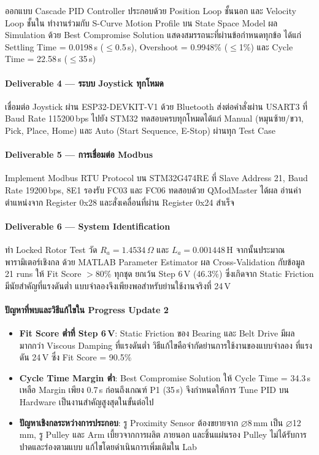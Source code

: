 ออกแบบ Cascade PID Controller
ประกอบด้วย Position Loop ชั้นนอก
และ Velocity Loop ชั้นใน
ทำงานร่วมกับ S-Curve Motion Profile
บน State Space Model
ผล Simulation ด้วย Best Compromise Solution
แสดงสมรรถนะที่ผ่านข้อกำหนดทุกข้อ
ได้แก่ Settling Time = 0.0198\,s ($\leq$0.5\,s),
Overshoot = 0.9948\% ($\leq$1\%)
และ Cycle Time = 22.58\,s ($\leq$35\,s)

\paragraph{Deliverable 4 --- ระบบ Joystick ทุกโหมด}

เชื่อมต่อ Joystick ผ่าน ESP32-DEVKIT-V1
ด้วย Bluetooth ส่งต่อคำสั่งผ่าน USART3
ที่ Baud Rate 115200\,bps ไปยัง STM32
ทดสอบครบทุกโหมดได้แก่
Manual (หมุนซ้าย/ขวา, Pick, Place, Home)
และ Auto (Start Sequence, E-Stop)
ผ่านทุก Test Case

\paragraph{Deliverable 5 --- การเชื่อมต่อ Modbus}

Implement Modbus RTU Protocol
บน STM32G474RE ที่ Slave Address 21,
Baud Rate 19200\,bps, 8E1
รองรับ FC03 และ FC06
ทดสอบด้วย QModMaster ได้ผล
อ่านค่าตำแหน่งจาก Register 0x28
และสั่งเคลื่อนที่ผ่าน Register 0x24 สำเร็จ

\paragraph{Deliverable 6 --- System Identification}

ทำ Locked Rotor Test วัด $R_a = 1.4534\,\Omega$
และ $L_a = 0.001448$\,H
จากนั้นประมาณพารามิเตอร์เชิงกล
ด้วย MATLAB Parameter Estimator
ผล Cross-Validation กับข้อมูล 21 runs
ให้ Fit Score $>$80\% ทุกชุด
ยกเว้น Step 6\,V (46.3\%)
ซึ่งเกิดจาก Static Friction
มีนัยสำคัญที่แรงดันต่ำ
แบบจำลองจึงเพียงพอสำหรับย่านใช้งานจริงที่ 24\,V

\paragraph{ปัญหาที่พบและวิธีแก้ไขใน Progress Update 2}

\begin{itemize}
  \item \textbf{Fit Score ต่ำที่ Step 6\,V}:
        Static Friction ของ Bearing และ Belt Drive
        มีผลมากกว่า Viscous Damping ที่แรงดันต่ำ
        วิธีแก้ไขคือจำกัดย่านการใช้งานของแบบจำลอง
        ที่แรงดัน 24\,V ซึ่ง Fit Score = 90.5\%
  \item \textbf{Cycle Time Margin ต่ำ}:
        Best Compromise Solution ให้ Cycle Time
        = 34.3\,s เหลือ Margin เพียง 0.7\,s
        ก่อนถึงเกณฑ์ P1 (35\,s)
        จึงกำหนดให้การ Tune PID บน Hardware
        เป็นงานสำคัญสูงสุดในขั้นต่อไป
  \item \textbf{ปัญหาเชิงกลระหว่างการประกอบ}:
        รู Proximity Sensor ต้องขยายจาก
        $\diameter$8\,mm เป็น $\diameter$12\,mm,
        รู Pulley และ Arm เบี้ยวจากการผลิต
        ภายนอก และชิ้นแผ่นรอง Pulley
        ไม่ได้รับการปาดและร่องตามแบบ
        แก้ไขโดยดำเนินการเพิ่มเติมใน Lab
\end{itemize}

